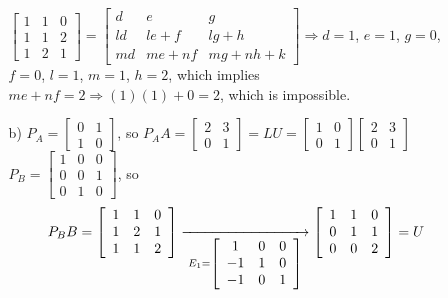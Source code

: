 \documentclass[12pt]{article}
\begin{document}
\begin{itemize}
\begin{itemize}
               $\left[\begin{array}{ccc} 1 & 1 & 0\\ 1 & 1 & 2\\ 1& 2& 1\end{array}\right] = 
    		   \left[\begin{array}{ccc} d & e & g\\ ld & le+f & lg+h\\ md& me+nf& mg+nh+k\end{array}\right]
               \Rightarrow d=1$, $e=1$, $g=0$, $f=0$, $l=1$, $m=1$, $h=2$, which implies $me+nf=2 \Rightarrow 					   (1)(1)+0=2$, which is impossible.
    \item[b)]  $P_A=\left[\begin{array}{cc}  0 & 1 \\ 1 & 0 \end{array}\right]$, so $P_AA=
    		   \left[\begin{array}{cc}  2 & 3 \\ 0 & 1 \end{array}\right] = LU = 
               \left[\begin{array}{cc}  1 & 0 \\ 0 & 1 \end{array}\right]\left[\begin{array}{cc}  2 & 3 \\ 0 & 1 				   \end{array}\right]$ \\
               $P_B=\left[\begin{array}{ccc} 1 & 0 & 0\\ 0 & 0 & 1\\ 0& 1& 0\end{array}\right]$, so 
               \begin{equation*}
               P_BB=\left[\begin{array}{ccc} 1 & 1 & 0\\ 1 & 2 & 1\\ 1& 1& 2\end{array}\right]
               \underset{E_{1}=
               \left[\begin{array}{ccc}
               1 & 0 & 0 \\ 
               -1 & 1 & 0 \\ 
               -1 & 0 & 1 \end{array}\right]}{\xrightarrow{\hspace{30mm}}}
               \left[\begin{array}{ccc} 1 & 1 & 0\\ 0 & 1 & 1\\ 0& 0& 2\end{array}\right] = U

\end{equation*}
\end{itemize}
\end{itemize}
\end{document}
